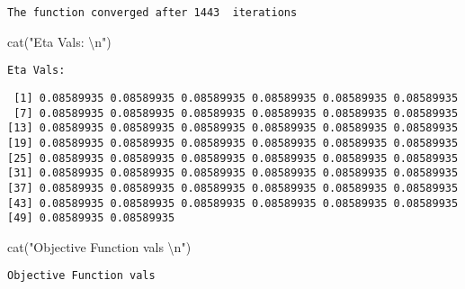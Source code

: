 \documentclass[
  letterpaper,
  DIV=11,
  numbers=noendperiod]{scrartcl}
\newenvironment{Shaded}{\begin{snugshade}}{\end{snugshade}}
\newcommand{\DecValTok}[1]{\textcolor[rgb]{0.68,0.00,0.00}{#1}}
\newcommand{\FunctionTok}[1]{\textcolor[rgb]{0.28,0.35,0.67}{#1}}
\newcommand{\NormalTok}[1]{\textcolor[rgb]{0.00,0.23,0.31}{#1}}
\newcommand{\SpecialCharTok}[1]{\textcolor[rgb]{0.37,0.37,0.37}{#1}}
\newcommand{\StringTok}[1]{\textcolor[rgb]{0.13,0.47,0.30}{#1}}
\begin{document}
\begin{verbatim}
The function converged after 1443  iterations 
\end{verbatim}

\begin{Shaded}
\begin{Highlighting}[]
\FunctionTok{cat}\NormalTok{(}\StringTok{"Eta Vals: }\SpecialCharTok{\textbackslash{}n}\StringTok{"}\NormalTok{)}
\end{Highlighting}
\end{Shaded}

\begin{verbatim}
Eta Vals: 
\end{verbatim}

\begin{Shaded}
\end{Shaded}

\begin{verbatim}
 [1] 0.08589935 0.08589935 0.08589935 0.08589935 0.08589935 0.08589935
 [7] 0.08589935 0.08589935 0.08589935 0.08589935 0.08589935 0.08589935
[13] 0.08589935 0.08589935 0.08589935 0.08589935 0.08589935 0.08589935
[19] 0.08589935 0.08589935 0.08589935 0.08589935 0.08589935 0.08589935
[25] 0.08589935 0.08589935 0.08589935 0.08589935 0.08589935 0.08589935
[31] 0.08589935 0.08589935 0.08589935 0.08589935 0.08589935 0.08589935
[37] 0.08589935 0.08589935 0.08589935 0.08589935 0.08589935 0.08589935
[43] 0.08589935 0.08589935 0.08589935 0.08589935 0.08589935 0.08589935
[49] 0.08589935 0.08589935
\end{verbatim}

\begin{Shaded}
\begin{Highlighting}[]
\FunctionTok{cat}\NormalTok{(}\StringTok{"Objective Function vals }\SpecialCharTok{\textbackslash{}n}\StringTok{"}\NormalTok{)}
\end{Highlighting}
\end{Shaded}

\begin{verbatim}
Objective Function vals 
\end{verbatim}

\begin{Shaded}
\end{Shaded}
\end{document}
